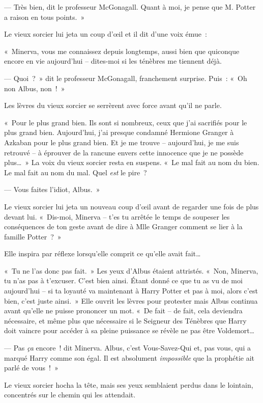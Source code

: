 --- Très bien, dit le professeur McGonagall.
Quant à moi, je pense que M. Potter a raison en tous points.~»

Le vieux sorcier lui jeta un coup d'œil et il dit d'une voix émue~:

«~Minerva, vous me connaissez depuis longtemps, aussi bien que quiconque encore en vie aujourd'hui -- dites-moi si les ténèbres me tiennent déjà.

--- Quoi~?~»
dit le professeur McGonagall, franchement surprise.
Puis~: «~Oh non Albus, non~!~»

Les lèvres du vieux sorcier se serrèrent avec force avant qu'il ne parle.

«~Pour le plus grand bien.
Ils sont si nombreux, ceux que j'ai sacrifiés pour le plus grand bien.
Aujourd'hui, j'ai presque condamné Hermione Granger à Azkaban pour le plus grand bien.
Et je me trouve -- aujourd'hui, je me suis retrouvé -- à éprouver de la rancune envers cette innocence que je ne possède plus…~»
La voix du vieux sorcier resta en suspens.
«~Le mal fait au nom du bien.
Le mal fait au nom du mal.
Quel \emph{est} le pire~?

--- Vous faites l'idiot, Albus.~»

Le vieux sorcier lui jeta un nouveau coup d'œil avant de regarder une fois de plus devant lui.
«~Dis-moi, Minerva -- t'es tu arrêtée le temps de soupeser les conséquences de ton geste avant de dire à Mlle Granger comment se lier à la famille Potter~?~»

Elle inspira par réflexe lorsqu'elle comprit ce qu'elle avait fait…

«~Tu ne l'as donc pas fait.~»
Les yeux d'Albus étaient attristés.
«~Non, Minerva, tu n'as pas à t'excuser.
C'est bien ainsi.
Étant donné ce que tu as vu de moi aujourd'hui -- si ta loyauté va maintenant à Harry Potter et pas à moi, alors c'est bien, c'est juste ainsi.~»
Elle ouvrit les lèvres pour protester mais Albus continua avant qu'elle ne puisse prononcer un mot.
«~De fait -- de fait, cela deviendra nécessaire, et même plus que nécessaire si le Seigneur des Ténèbres que Harry doit vaincre pour accéder à sa pleine puissance se révèle ne pas être Voldemort…

--- Pas \emph{ça} encore~! dit Minerva.
Albus, c'est Vous-Savez-Qui et, pas vous, qui a marqué Harry comme son égal.
Il est absolument \emph{impossible} que la prophétie ait parlé de vous~!~»

Le vieux sorcier hocha la tête, mais ses yeux semblaient perdus dans le lointain, concentrés sur le chemin qui les attendait.

